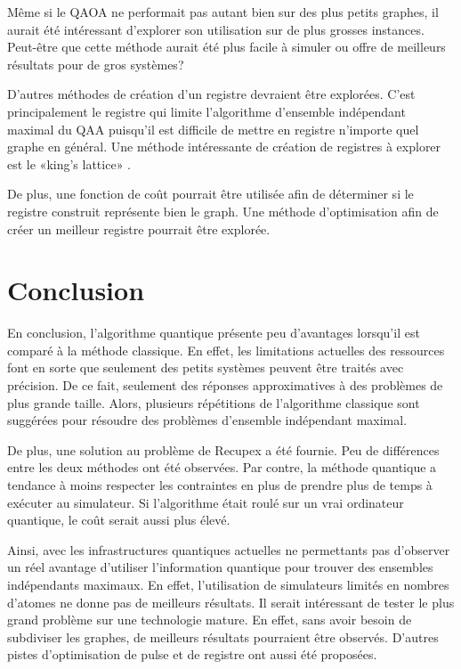 \documentclass[11pt]{article}
\begin{document}
Même si le QAOA ne performait pas autant bien sur des plus petits graphes, il aurait été intéressant d'explorer son utilisation sur de plus grosses instances. Peut-être que cette méthode aurait été plus facile à simuler ou offre de meilleurs résultats pour de gros systèmes?

D'autres méthodes de création d'un registre devraient être explorées. C'est principalement le registre qui limite l'algorithme d'ensemble indépendant maximal du QAA puisqu'il est difficile de mettre en registre n'importe quel graphe en général. Une méthode intéressante de création de registres  à explorer est le «king's lattice» \cite{kim_quantum_2023}.

De plus, une fonction de coût pourrait être utilisée afin de déterminer si le registre construit représente bien le graph. Une méthode d'optimisation afin de créer un meilleur registre pourrait être explorée.


\section{Conclusion}
En conclusion, l'algorithme quantique présente peu d’avantages lorsqu'il est comparé à la méthode classique. En effet, les limitations actuelles des ressources font en sorte que seulement des petits systèmes peuvent être traités avec précision. De ce fait, seulement des réponses approximatives à des problèmes de plus grande taille. Alors, plusieurs répétitions de l'algorithme classique sont suggérées pour résoudre des problèmes d'ensemble indépendant maximal. 

De plus, une solution au problème de Recupex a été fournie. Peu de différences entre les deux méthodes ont été observées. Par contre, la méthode quantique a tendance à moins respecter les contraintes en plus de prendre plus de temps à exécuter au simulateur. Si l'algorithme était roulé sur un vrai ordinateur quantique, le coût serait aussi plus élevé.

Ainsi, avec les infrastructures quantiques actuelles ne permettants pas d'observer un réel avantage d'utiliser l'information quantique pour trouver des ensembles indépendants maximaux. En effet, l'utilisation de simulateurs limités en nombres d'atomes ne donne pas de meilleurs résultats. Il serait intéressant de tester le plus grand problème sur une technologie mature. En effet, sans avoir besoin de subdiviser les graphes, de meilleurs résultats pourraient être observés. D'autres pistes d'optimisation de pulse et de registre ont aussi été proposées.
\end{document}
